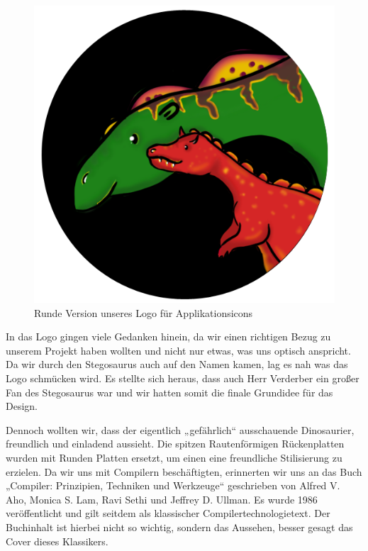 \documentclass[a4paper, 12pt]{article}
\begin{document}
\begin{figure}[h]
    \caption{Runde Version unseres Logo f\"ur Applikationsicons}
    \centering
    \includegraphics[scale=0.3]{logo-round}
\end{figure}

In das Logo gingen viele Gedanken hinein, da wir einen richtigen Bezug zu unserem Projekt haben wollten und nicht nur etwas, was uns optisch anspricht. Da wir durch den Stegosaurus auch auf den Namen kamen, lag es nah was das Logo schmücken wird. Es stellte sich heraus, dass auch Herr Verderber ein großer Fan des Stegosaurus war und wir hatten somit die finale Grundidee für das Design. 


Dennoch wollten wir, dass der eigentlich „gefährlich“ ausschauende Dinosaurier, freundlich und einladend aussieht. Die spitzen Rautenförmigen Rückenplatten wurden mit Runden Platten ersetzt, um einen eine freundliche Stilisierung zu erzielen.  
Da wir uns mit Compilern beschäftigten, erinnerten wir uns an das Buch „Compiler: Prinzipien, Techniken und Werkzeuge“ geschrieben von Alfred V. Aho, Monica S. Lam, Ravi Sethi und Jeffrey D. Ullman. Es wurde 1986 veröffentlicht und gilt seitdem als klassischer Compilertechnologietext. Der Buchinhalt ist hierbei nicht so wichtig, sondern das Aussehen, besser gesagt das Cover dieses Klassikers. 
\end{document}
